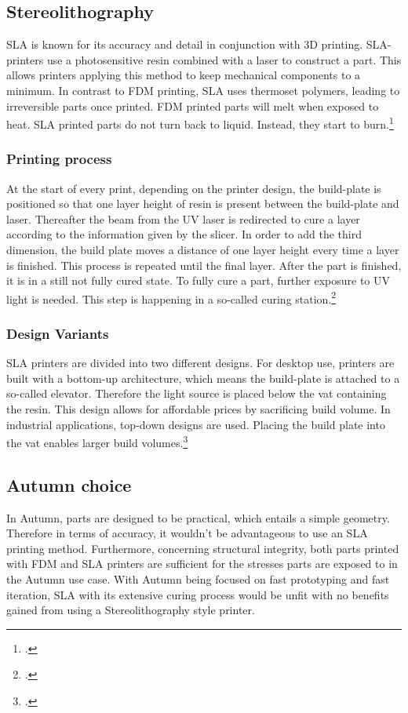 \subsection{Stereolithography}

SLA is known for its accuracy and detail in conjunction with 3D printing. SLA-printers use a photosensitive resin combined with a laser to construct a part. This allows printers applying this method to keep mechanical components to a minimum. In contrast to FDM printing, SLA uses thermoset polymers, leading to irreversible parts once printed. FDM printed parts will melt when exposed to heat. SLA printed parts do not turn back to liquid. Instead, they start to burn.\footcite{hubsSLA3DPrintingNoDate}

\subsubsection{Printing process}

At the start of every print, depending on the printer design, the build-plate is positioned so that one layer height of resin is present between the build-plate and laser. Thereafter the beam from the UV laser is redirected to cure a layer according to the information given by the slicer. In order to add the third dimension, the build plate moves a distance of one layer height every time a layer is finished. This process is repeated until the final layer.\newline
After the part is finished, it is in a still not fully cured state. To fully cure a part, further exposure to UV light is needed. This step is happening in a so-called curing station.\footcite{hubsSLA3DPrintingNoDate} 

\subsubsection{Design Variants}

SLA printers are divided into two different designs. For desktop use, printers are built with a bottom-up architecture, which means the build-plate is attached to a so-called elevator. Therefore the light source is placed below the vat containing the resin. This design allows for affordable prices by sacrificing build volume.\newline
In industrial applications, top-down designs are used. Placing the build plate into the vat enables larger build volumes.\footcite{hubsSLA3DPrintingNoDate}

\subsection{Autumn choice}

In Autumn, parts are designed to be practical, which entails a simple geometry. Therefore in terms of accuracy, it wouldn't be advantageous to use an SLA printing method. Furthermore, concerning structural integrity, both parts printed with FDM and SLA printers are sufficient for the stresses parts are exposed to in the Autumn use case. With Autumn being focused on fast prototyping and fast iteration, SLA with its extensive curing process would be unfit with no benefits gained from using a Stereolithography style printer. 
